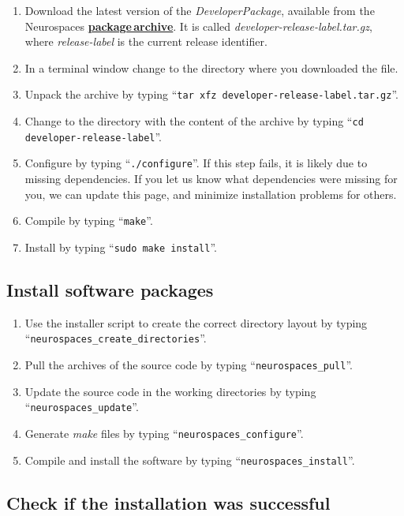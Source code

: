 \documentclass[12pt]{article}
\begin{document}
\begin{enumerate}
   \item Download the latest version of the {\it DeveloperPackage}, available from the Neurospaces \href{http://repo-genesis3.cbi.utsa.edu/src/}{\bf package\,archive}. It is called {\it developer-release-label.tar.gz}, where {\it release-label} is the current release identifier.
   \item In a terminal window change to the directory where you downloaded the file.
   \item Unpack the archive by typing ``{\tt tar xfz developer-release-label.tar.gz}''.
   \item Change to the directory with the content of the archive by typing ``{\tt cd developer-release-label}''.
   \item Configure by typing ``{\tt ./configure}''.  If this step fails, it is likely due to missing dependencies.  If you let us know what dependencies were missing for you, we can update this page, and minimize installation problems for others.
   \item Compile by typing ``{\tt make}''.
   \item Install by typing ``{\tt sudo make install}''. 
\end{enumerate}

\subsection*{Install software packages}

\begin{enumerate}
   \item Use the installer script to create the correct directory layout by typing ``{\tt neurospaces\_create\_directories}''.
   \item Pull the archives of the source code by typing ``{\tt neurospaces\_pull}''.
   \item Update the source code in the working directories by typing ``{\tt neurospaces\_update}''.
   \item Generate {\it make} files by typing ``{\tt neurospaces\_configure}''.
   \item Compile and install the software by typing ``{\tt neurospaces\_install}''.
\end{enumerate}

\subsection*{Check if the installation was successful}
\end{document}
